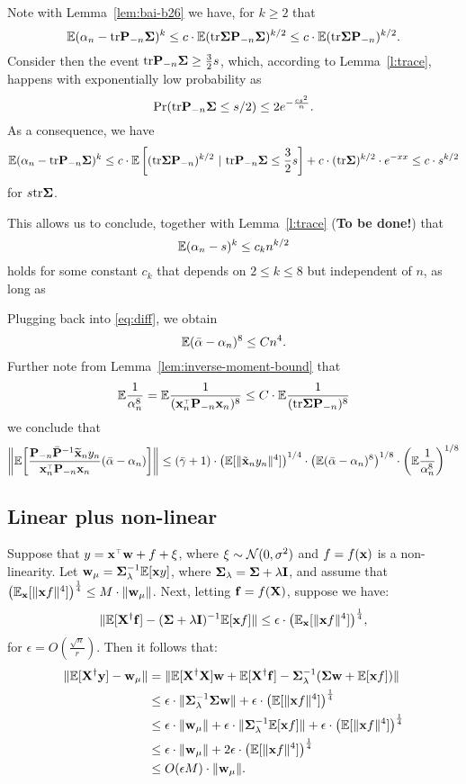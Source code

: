 \documentclass[11pt]{article}
\begin{document}
Note with Lemma~\ref{lem:bai-b26} we have, for $k \ge 2$ that
\[
  \mathbb E (\alpha_n - \mathrm{tr} \mathbf P_{-n} \mathbf{\Sigma})^k \le c \cdot \mathbb E (\mathrm{tr} \mathbf{\Sigma} \mathbf P_{-n} \mathbf{\Sigma})^{k/2} \le c \cdot \mathbb E (\mathrm{tr} \mathbf{\Sigma} \mathbf P_{-n})^{k/2}.
\]
Consider then the event $\mathrm{tr} \mathbf P_{-n} \mathbf{\Sigma} \ge \frac32 s$, which, according to Lemma~\ref{l:trace}, happens with exponentially low probability as
\[
  \mathrm{Pr}(\mathrm{tr} \mathbf P_{-n} \mathbf{\Sigma} \le s/2) \le 2 e^{- \frac{c s^2}n}.
\]
As a consequence, we have
\[
  \mathbb E (\alpha_n - \mathrm{tr} \mathbf P_{-n} \mathbf{\Sigma})^k \le c \cdot \mathbb E \left[ (\mathrm{tr} \mathbf{\Sigma} \mathbf P_{-n})^{k/2}~|~\mathrm{tr} \mathbf P_{-n} \mathbf{\Sigma} \le \frac32 s\right] + c \cdot (\mathrm{tr} \mathbf{\Sigma})^{k/2} \cdot e^{-xx} \le c \cdot s^{k/2}
\]
for $s \mathrm{tr} \mathbf{\Sigma} $.

This allows us to conclude, together with Lemma~\ref{l:trace} (\textbf{To be done!}) that
\[
  \mathbb E (\alpha_n - s)^k \le c_k n^{k/2}
\]
holds for some constant $c_k$ that depends on $2 \le k \le 8$ but independent of $n$, as long as

Plugging back into \eqref{eq:diff}, we obtain
\[
  \mathbb E (\bar \alpha - \alpha_n)^8 \le C n^4.
\]
Further note from Lemma~\ref{lem:inverse-moment-bound} that
\[
  \E \frac1{ \alpha_n^8 } = \E \frac1{ (\x_n^\top \P_{-n} \x_n)^8} \le C \cdot \E \frac1{ (\tr \Sigmab \P_{-n})^8 }
\]
we conclude that
\[
  \bigg\|\E\bigg[\frac{\P_{-n}\bar\P^{-1}\xbt_ny_n}{\x_n^\top\P_{-n}\x_n} (\bar\alpha-\alpha_n)\bigg]\bigg\| \le (\bar \gamma + 1) \cdot \left( \E[ \| \tilde \x_n y_n \|^4 ] \right)^{1/4} \cdot \left( \E (\bar \alpha - \alpha_n)^8 \right)^{1/8} \cdot \left( \E \frac1{ \alpha_n^8 } \right)^{1/8}
\]


\subsection{Linear plus non-linear}
Suppose that $y = \x^\top\w + f + \xi$, where
$\xi\sim\mathcal{N}(0,\sigma^2)$ and $f=f(\mathbf x)$ is a non-linearity.
Let $\mathbf w_\mu = \mathbf{\Sigma}_\lambda^{-1}\mathbb E[\mathbf x y]$, where $\mathbf{\Sigma}_\lambda =
\mathbf{\Sigma}+\lambda\mathbf I$, and assume that  
$ \big(\mathbb E_\mathbf x[\|\mathbf x f\|^4]\big)^{\frac14}\leq M\cdot \|\mathbf w_\mu\|$. Next,
letting $\mathbf f = f(\mathbf X)$, suppose we have:
\begin{align*}
  \|\mathbb E[\mathbf X^\dagger\mathbf f] - (\mathbf{\Sigma}+\lambda\mathbf I)^{-1}\mathbb E[\mathbf x f]\|\leq \epsilon\cdot
 \big(\mathbb E_\mathbf x[\|\mathbf x f\|^4]\big)^{\frac14},
\end{align*}
for $\epsilon=O(\frac{\sqrt n}{r})$. Then it follows that:
\begin{align*}
  \|\mathbb E[\mathbf X^\dagger\mathbf y] - \mathbf w_\mu\|
  &= \|\mathbb E[\mathbf X^\dagger\mathbf X]\mathbf w + \mathbb E[\mathbf X^\dagger\mathbf f] -
    \mathbf{\Sigma}_\lambda^{-1}(\mathbf{\Sigma}\mathbf w + \mathbb E[\mathbf x f])\|\\
  &\leq \epsilon\cdot \|\mathbf{\Sigma}_\lambda^{-1}\mathbf{\Sigma}\mathbf w\| +
    \epsilon\cdot \big(\mathbb E[\|\mathbf x f\|^4]\big)^{\frac14}\\
  &\leq  \epsilon\cdot \|\mathbf w_\mu\| + \epsilon\cdot
    \|\mathbf{\Sigma}_\lambda^{-1}\mathbb E[\mathbf x f]\| +  \epsilon\cdot \big(\mathbb E[\|\mathbf x
    f\|^4]\big)^{\frac14}\\
  &\leq \epsilon\cdot \|\mathbf w_\mu\| + 2\epsilon\cdot \big(\mathbb E[\|\mathbf x
    f\|^4]\big)^{\frac14}\\
  &\leq O(\epsilon M)\cdot \|\mathbf w_\mu\|.
\end{align*}
\end{document}
